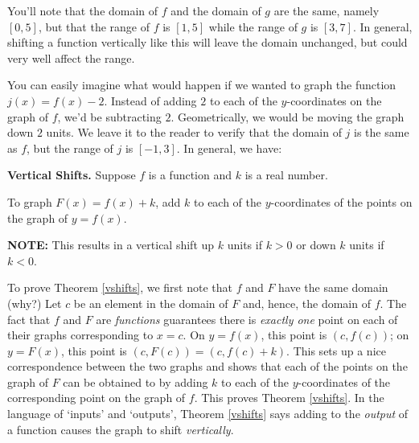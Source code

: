 You'll note that the domain of $f$ and the domain of $g$ are the same, namely $[0,5]$, but that the range of $f$ is $[1,5]$ while the range of $g$ is $[3,7]$.  In general, shifting a function vertically like this will leave the domain unchanged, but could very well affect the range.  

\smallskip

You can easily imagine what would happen if we wanted to graph the function $j(x) = f(x) - 2$.  Instead of adding $2$ to each of the $y$-coordinates on the graph of $f$, we'd be subtracting $2$.  Geometrically, we would be moving the graph down $2$ units.  We leave it to the reader to verify that the domain of $j$ is the same as $f$, but the range of $j$ is $[-1,3]$.  In general, we have:

\smallskip

\colorbox{ResultColor}{\bbm


\begin{thm} \label{vshifts} \textbf{Vertical Shifts.} Suppose $f$ is a function and $k$ is a real number. 

To graph $F(x) = f(x) + k$,  add $k$ to each of the $y$-coordinates of the points on the graph of $y=f(x)$.

\textbf{NOTE:}  This results in a vertical shift up $k$ units if $k > 0$ or down $k$ units if $k< 0$.


\end{thm}

\ebm}

\smallskip

To prove Theorem \ref{vshifts}, we first note that $f$ and $F$ have the same domain (why?)  Let $c$ be an element in the domain of $F$ and, hence, the domain of $f$.  The fact that $f$ and $F$ are \textit{functions} guarantees  there is \textit{exactly one} point on each of their  graphs corresponding to $x=c$.  On $y=f(x)$, this point is $(c, f(c))$;  on $y = F(x)$, this point is  $(c, F(c)) = (c, f(c)+k)$.  This sets up a nice correspondence between the two graphs and shows that each of the points on the graph of $F$ can be obtained to by adding $k$ to each of the $y$-coordinates of the corresponding point on the graph  of $f$.  This  proves  Theorem \ref{vshifts}.   In the language of `inputs' and `outputs', Theorem \ref{vshifts} says adding to the \textit{output} of a function causes the graph to shift \textit{vertically}. 
 
\smallskip

